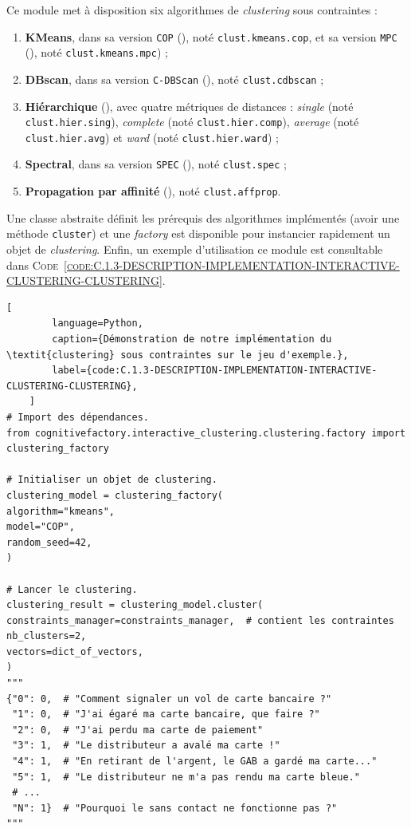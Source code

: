 	Ce module met à disposition six algorithmes de \textit{clustering} sous contraintes :
	\begin{enumerate}
		\item \textbf{KMeans}, dans sa version \texttt{COP} (\cite{wagstaff-etal:2001:constrained-kmeans-clustering}), noté \texttt{clust.kmeans.cop}, et sa version \texttt{MPC} (\cite{khan-etal:2012:multiple-parameter-based}), noté \texttt{clust.kmeans.mpc}) ;
		\item \textbf{DBscan}, dans sa version \texttt{C-DBScan} (\cite{ruiz-etal:2010:densitybased-semisupervised-clustering}), noté \texttt{clust.cdbscan} ;
		\item \textbf{Hiérarchique} (\cite{davidson-ravi:2005:agglomerative-hierarchical-clustering}), avec quatre métriques de distances : \textit{single} (noté \texttt{clust.hier.sing}), \textit{complete} (noté \texttt{clust.hier.comp}), \textit{average} (noté \texttt{clust.hier.avg}) et \textit{ward} (noté \texttt{clust.hier.ward}) ;
		\item \textbf{Spectral}, dans sa version \texttt{SPEC} (\cite{kamvar-etal:2003:spectral-learning}), noté \texttt{clust.spec} ;
		\item \textbf{Propagation par affinité} (\cite{givoni-frey:2009:semisupervised-affinity-propagation}), noté \texttt{clust.affprop}.
	\end{enumerate}
	
	Une classe abstraite définit les prérequis des algorithmes implémentés (avoir une méthode \texttt{cluster}) et une \textit{factory} est disponible pour instancier rapidement un objet de \textit{clustering}.
	Enfin, un exemple d'utilisation ce module est consultable dans \textsc{Code~\ref{code:C.1.3-DESCRIPTION-IMPLEMENTATION-INTERACTIVE-CLUSTERING-CLUSTERING}}.
	
	
	\begin{lstlisting}[
		language=Python,
		caption={Démonstration de notre implémentation du \textit{clustering} sous contraintes sur le jeu d'exemple.},
		label={code:C.1.3-DESCRIPTION-IMPLEMENTATION-INTERACTIVE-CLUSTERING-CLUSTERING},
	]
# Import des dépendances.
from cognitivefactory.interactive_clustering.clustering.factory import clustering_factory

# Initialiser un objet de clustering.
clustering_model = clustering_factory(
algorithm="kmeans",
model="COP",
random_seed=42,
)

# Lancer le clustering.
clustering_result = clustering_model.cluster(
constraints_manager=constraints_manager,  # contient les contraintes
nb_clusters=2,
vectors=dict_of_vectors,
)
"""
{"0": 0,  # "Comment signaler un vol de carte bancaire ?"
 "1": 0,  # "J'ai égaré ma carte bancaire, que faire ?"
 "2": 0,  # "J'ai perdu ma carte de paiement"
 "3": 1,  # "Le distributeur a avalé ma carte !"
 "4": 1,  # "En retirant de l'argent, le GAB a gardé ma carte..."
 "5": 1,  # "Le distributeur ne m'a pas rendu ma carte bleue."
 # ...
 "N": 1}  # "Pourquoi le sans contact ne fonctionne pas ?"
"""
	\end{lstlisting}
	
